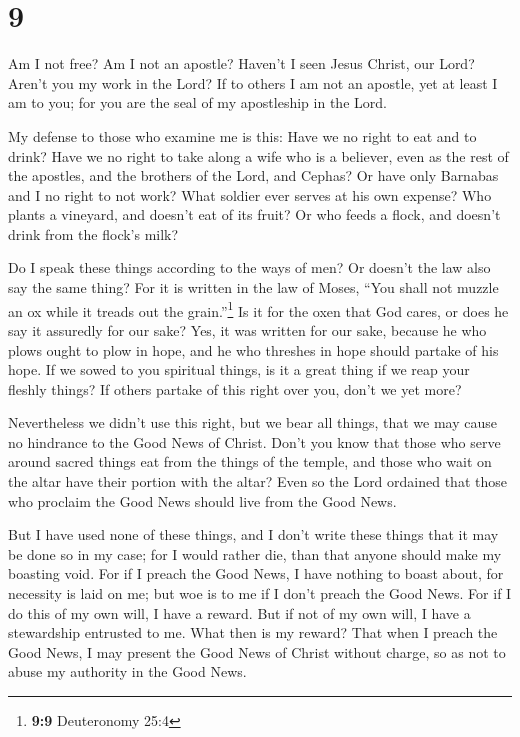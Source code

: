 \hypertarget{section-8}{%
\section{9}\label{section-8}}

 Am I not free? Am I not an apostle? Haven't I seen Jesus
Christ, our Lord? Aren't you my work in the Lord?  If to
others I am not an apostle, yet at least I am to you; for you are the
seal of my apostleship in the Lord.

 My defense to those who examine me is this:
 Have we no right to eat and to drink?  Have
we no right to take along a wife who is a believer, even as the rest of
the apostles, and the brothers of the Lord, and Cephas? 
Or have only Barnabas and I no right to not work?  What
soldier ever serves at his own expense? Who plants a vineyard, and
doesn't eat of its fruit? Or who feeds a flock, and doesn't drink from
the flock's milk?

 Do I speak these things according to the ways of men? Or
doesn't the law also say the same thing?  For it is
written in the law of Moses, ``You shall not muzzle an ox while it
treads out the grain.''\footnote{\textbf{9:9} Deuteronomy 25:4} Is it
for the oxen that God cares,  or does he say it assuredly
for our sake? Yes, it was written for our sake, because he who plows
ought to plow in hope, and he who threshes in hope should partake of his
hope.  If we sowed to you spiritual things, is it a great
thing if we reap your fleshly things?  If others partake
of this right over you, don't we yet more?

Nevertheless we didn't use this right, but we bear all things, that we
may cause no hindrance to the Good News of Christ.  Don't
you know that those who serve around sacred things eat from the things
of the temple, and those who wait on the altar have their portion with
the altar?  Even so the Lord ordained that those who
proclaim the Good News should live from the Good News.

 But I have used none of these things, and I don't write
these things that it may be done so in my case; for I would rather die,
than that anyone should make my boasting void.  For if I
preach the Good News, I have nothing to boast about, for necessity is
laid on me; but woe is to me if I don't preach the Good News.
 For if I do this of my own will, I have a reward. But if
not of my own will, I have a stewardship entrusted to me.
 What then is my reward? That when I preach the Good
News, I may present the Good News of Christ without charge, so as not to
abuse my authority in the Good News.

